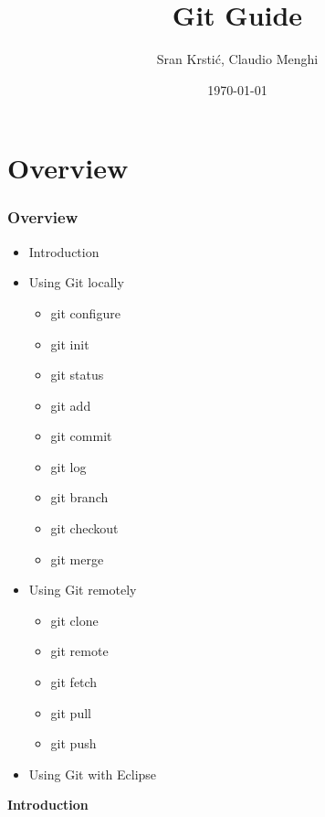 \documentclass{beamer}
\title[Git Guide]{Git Guide} %
\author{Sr\dj{}an Krsti\'c, Claudio Menghi} %
\institute[] %
{
Politecnico di Milano \\ %
\medskip
\textit{srdan.krstic@polimi.it, claudio.menghi@polimi.it} %
}
\date{\today} %
\begin{document}
\begin{frame}
\titlepage %
\end{frame}





\section{Overview}
\begin{frame}
\frametitle{Overview}


\begin{itemize}
\item Introduction
\item Using Git locally
  \begin{itemize}
  \item git configure
  \item git init
  \item git status
  \item git add
  \item git commit
  \item git log
  \item git branch
  \item git checkout
  \item git merge
  \end{itemize}
\item Using Git remotely
  \begin{itemize}
  \item git clone
  \item git remote
  \item git fetch
  \item git pull
  \item git push
  \end{itemize}
\item Using Git with Eclipse
\end{itemize}
\end{frame}





\begin{frame}

\LARGE	
\textbf{Introduction}


\end{frame}
\end{document}
